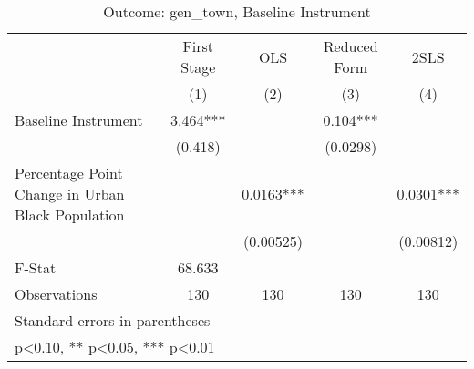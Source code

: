 \begin{table}[htbp]\centering
\def\sym#1{\ifmmode^{#1}\else\(^{#1}\)\fi}
\caption{Outcome: gen\_town, Baseline Instrument}
\begin{tabular}{l*{4}{c}}
\toprule
                    & First Stage   &         OLS   &Reduced Form   &        2SLS   \\
                    &\multicolumn{1}{c}{(1)}   &\multicolumn{1}{c}{(2)}   &\multicolumn{1}{c}{(3)}   &\multicolumn{1}{c}{(4)}   \\
\midrule
Baseline Instrument &       3.464***&               &       0.104***&               \\
                    &     (0.418)   &               &    (0.0298)   &               \\
\addlinespace
Percentage Point Change in Urban Black Population&               &      0.0163***&               &      0.0301***\\
                    &               &   (0.00525)   &               &   (0.00812)   \\
\midrule
F-Stat              &      68.633   &               &               &               \\
Observations        &         130   &         130   &         130   &         130   \\
\bottomrule
\multicolumn{5}{l}{\footnotesize Standard errors in parentheses}\\
\multicolumn{5}{l}{\footnotesize * p<0.10, ** p<0.05, *** p<0.01}\\
\end{tabular}
\end{table}
